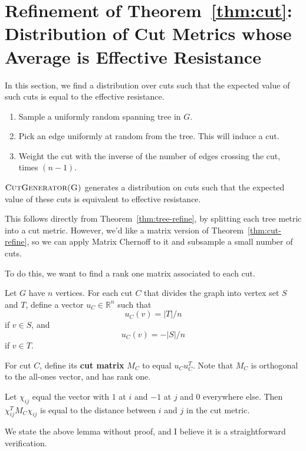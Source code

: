 \section{Refinement of Theorem~\ref{thm:cut}: Distribution of Cut
Metrics whose Average is Effective Resistance}
In this section, we find a distribution over cuts such that the expected
value of such cuts is equal to the effective resistance.

\begin{algorithm} [H]
  \caption{$\textsc{CutGenerator(G)}$}
\begin{enumerate}
  \item Sample a uniformly random spanning tree in $G$.
  \item Pick an edge uniformly at random from the tree. This will induce
    a cut.
  \item Weight the cut with the inverse of the number of edges crossing the
    cut, times $(n-1)$.
\end{enumerate}
\end{algorithm}
\begin{theorem}\label{thm:cut-refine} $\textsc{CutGenerator(G)}$ generates a distribution on
  cuts such that the expected value of these cuts is equivalent to
  effective resistance.
\end{theorem}

This follows directly from Theorem~\ref{thm:tree-refine}, by splitting
each tree metric into a cut metric. However, we'd like a matrix version of
Theorem~\ref{thm:cut-refine}, so we can apply Matrix Chernoff to it and
subsample a small number of cuts.

To do this, we want to find a rank one matrix associated to each cut. 
\begin{definition}\label{def:cut-matrix}
Let $G$ have $n$ vertices.  For each cut $C$ that divides the graph into vertex set $S$ and $T$,
  define a vector $u_C \in \mathbb{R}^n$ such that 
  \[ u_C(v) = |T|/n \] 
  if $v \in S$, and 
  \[ u_C(v) = -|S|/n \] 
  if $v \in T$.

For cut $C$, define its \textbf{cut matrix} $M_C$ to equal $u_C
  u_C^T$. Note that $M_C$ is orthogonal to the all-ones vector, and has
  rank one.
\end{definition}

\begin{lemma}
Let $\chi_{ij}$ equal the vector with $1$ at $i$
  and $-1$ at $j$ and $0$ everywhere else. Then $\chi_{ij}^T M_C
  \chi_{ij}$ is equal to the distance between $i$ and $j$ in the cut
  metric.
\end{lemma}
We state the above lemma without proof, and I believe it is a
straightforward verification.

